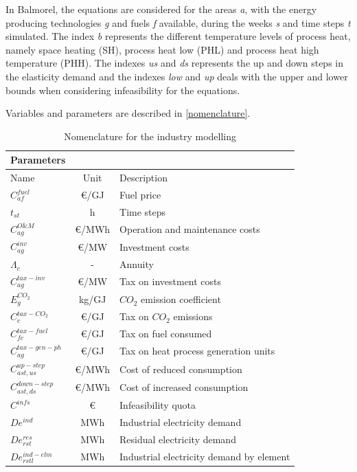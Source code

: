 \documentclass[review]{elsarticle}
\begin{document}
In Balmorel, the equations are considered for the areas \textit{a}, with the energy producing technologies \textit{g} and fuels \textit{f} available, during the weeks \textit{s} and time steps \textit{t} simulated. The index \textit{b} represents the different temperature levels of process heat, namely space heating (SH), process heat low (PHL) and process heat high temperature (PHH). 
The indexes \textit{us} and \textit{ds} represents the up and down steps in the elasticity demand and the indexes \textit{low} and \textit{up} deals with the upper and lower bounds when considering infeasibility for the equations. 

Variables and parameters are described in \autoref{nomenclature}. 

\begin{table}[H]
\centering
\caption{Nomenclature for the industry modelling}
\label{nomenclature}
\begin{tabular}{lcl}
\hline
Parameters & &  \\ \hline
Name & Unit & Description \\ \hline
$C^{fuel}_{af}$ & \euro /GJ & Fuel price \\
$t_{st}$        & h    & Time steps \\ 
$C^{O\&M}_{ag}$ & \euro/MWh & Operation and maintenance costs \\
$C^{inv}_{ag}$ & \euro/MW & Investment costs \\
$\Lambda_c$ & - & Annuity \\
$C^{tax-inv}_{ag}$ & \euro/MW & Tax on investment costs \\
$E^{CO_{2}}_g$ & kg/GJ & $CO_2$ emission coefficient \\
$C^{tax-CO_2}_{c}$ & \euro/GJ & Tax on $CO_2$ emissions \\
$C^{tax-fuel}_{fc}$ & \euro/GJ & Tax on fuel consumed \\
$C^{tax-gen-ph}_{ag}$ & \euro/GJ & Tax on heat process generation units \\
$C^{up-step}_{ast,us}$ & \euro/MWh & Cost of reduced consumption \\  
$C^{down-step}_{ast,ds}$ & \euro/MWh & Cost of increased consumption \\
$C^{infs}$ & \euro & Infeasibility quota \\
$De^{ind}$ & MWh & Industrial electricity demand \\
$De^{res}_{rst}$ & MWh & Residual electricity demand \\
$De^{ind-elm}_{rstl}$ & MWh & Industrial electricity demand by element \\

\end{tabular}
\end{table}
\end{document}
